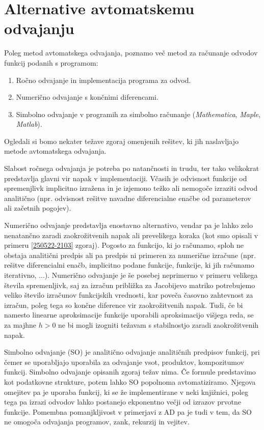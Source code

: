 \documentclass[12pt,slovene]{article}
\begin{document}
\section{Alternative avtomatskemu odvajanju}

Poleg metod avtomatskega odvajanja, poznamo več metod za računanje odvodov funkcij podanih s programom:

\begin{enumerate}
    \item Ročno odvajanje in implementacija programa za odvod.
    \item Numerično odvajanje s končnimi diferencami.
    \item Simbolno odvajanje v programih za simbolno računanje (\textit{Mathematica}, \textit{Maple}, \textit{Matlab}). 
\end{enumerate} 

Ogledali si bomo nekater težave zgoraj omenjenih rešitev, ki jih naslavljajo metode avtomatskega odvajanja. 

Slabost ročnega odvajanja je potreba po natančnosti in trudu, ter tako velikokrat predstavlja glavni vir napak v implementaciji. Včasih je odvisnost funkcije od spremenjlivk implicitno izražena in je izjemono težko ali nemogoče izraziti odvod analitično (npr. odvisnost rešitve navadne diferencialne enačbe od parameterov ali začetnih pogojev).  

Numerično odvajanje predstavlja enostavno alternativo, vendar pa je lahko zelo nenatančno zaradi zaokrožitvenih napak ali prevelikega koraka (kot smo opisali v primeru \ref{250522-2103} zgoraj). Pogosto za funkcijo, ki jo računamo, sploh ne obstaja analitični predpis ali pa predpis ni primeren za numerične izračune (npr. rešitve diferencialni enačb, implicitno podane funkcije, funkcije, ki jih računamo iterativno, ...). Numerično odvajanje je še posebej neprimerno v primeru velikega števila spremenljivk, saj za izračun približka za Jacobijevo matriko potrebujemo veliko število izračunov funkcijskih vrednosti, kar poveča časovno zahtevnost za izračun, poleg tega so končne diference vir zaokrožitvenih napak. Tudi, če bi namesto linearne aproksimacije funkcije uporabili aproksimacijo višjega reda, se za majhne $h>0$ ne bi mogli izogniti težavam s stabilnostjo zaradi zaokrožitvenih napak. 

Simbolno odvajanje (SO) je analitično odvajanje analitičnih predpisov funkcij, pri čemer se uporabljajo uporabila za odvajanje vsot, produktov, kompozitumov funkcij. Simbolno odvajanje opisanih zgoraj težav nima. Če formule predstavimo kot podatkovne strukture, potem lahko SO popolnoma avtomatiziramo. Njegova omejitev pa je uporaba funkcij, ki se že implementirane v neki knjižnici, poleg tega pa izrazi odvodov lahko postanejo ekponentno večji od izrazov prvotne funkcije. Pomembna pomanjkljivost v primerjavi z AD pa je tudi v tem, da SO ne omogoča odvajanja programov, zank, rekurzij in vejitev. 
\end{document}

